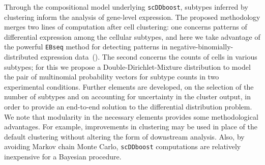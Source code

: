 \documentclass[aoas,preprint]{imsart}
\begin{document}
Through the compositional model underlying \verb+scDDboost+, subtypes inferred by clustering 
inform the analysis of gene-level expression.  The proposed methodology merges two lines of computation
after cell clustering: one concerns patterns of differential expression among 
the cellular subtypes, and here we take advantage of the powerful \verb+EBseq+ method for detecting
patterns in negative-binomially-distributed expression data~(\cite{oscope}).  The second concerns 
the counts of cells in various subtypes; for this we propose a Double-Dirichlet-Mixture distribution
to model the pair of multinomial probability vectors for subtype counts in two experimental conditions.
Further elements are developed, on the selection of the number of subtypes and on accounting for uncertainty in the cluster output,  in order to provide an end-to-end solution to the differential distribution
problem.  We note that modularity in the necessary elements provides some methodological advantages. For example,
improvements in clustering may be used in place of the default clustering
without altering the form of downstream analysis.  Also, by avoiding Markov chain Monte Carlo,
\verb+scDDboost+ computations are relatively inexpensive for a Bayesian procedure.
\end{document}
